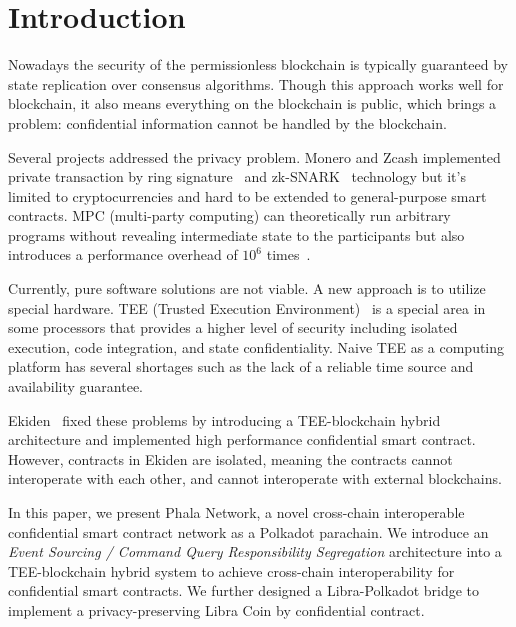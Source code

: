 \section{Introduction}

Nowadays the security of the permissionless blockchain is typically guaranteed by state replication over consensus algorithms. Though this approach works well for blockchain, it also means everything on the blockchain is public, which brings a problem: confidential information cannot be handled by the blockchain.

Several projects addressed the privacy problem. Monero and Zcash implemented private transaction by ring signature~\cite{monero} and zk-SNARK~\cite{zcash} technology but it's limited to cryptocurrencies and hard to be extended to general-purpose smart contracts. MPC (multi-party computing) can theoretically run arbitrary programs without revealing intermediate state to the participants but also introduces a performance overhead of $10^6$ times~\cite{cheng2019ekiden}.

Currently, pure software solutions are not viable. A new approach is to utilize special hardware. TEE (Trusted Execution Environment)~\cite{teewiki} is a special area in some processors that provides a higher level of security including isolated execution, code integration, and state confidentiality. Naive TEE as a computing platform has several shortages such as the lack of a reliable time source and availability guarantee.

Ekiden~\cite{cheng2019ekiden} fixed these problems by introducing a TEE-blockchain hybrid architecture and implemented high performance confidential smart contract. However, contracts in Ekiden are isolated, meaning the contracts cannot interoperate with each other, and cannot interoperate with external blockchains.

In this paper, we present Phala Network, a novel cross-chain interoperable confidential smart contract network as a Polkadot parachain. We introduce an \textit{Event Sourcing / Command Query Responsibility Segregation} \cite{eventsourcing, cqrs} architecture into a TEE-blockchain hybrid system to achieve cross-chain interoperability for confidential smart contracts. We further designed a Libra-Polkadot bridge to implement a privacy-preserving Libra Coin by confidential contract.
